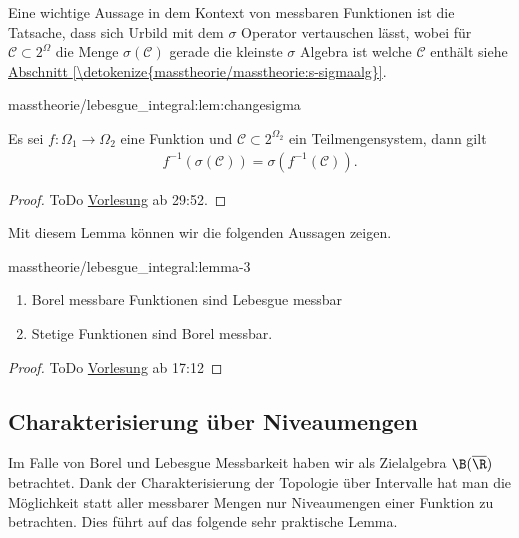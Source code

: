 \documentclass[letterpaper,10pt,german]{jupyterBook}
\begin{document}
\par
Eine wichtige Aussage in dem Kontext von messbaren Funktionen ist die Tatsache, dass sich Urbild mit dem \(\sigma\) Operator vertauschen lässt, wobei für \(\mathcal{C}\subset 2^\Omega\) die Menge \(\sigma(\mathcal{C})\) gerade die kleinste \(\sigma\) Algebra ist welche \(\mathcal{C}\) enthält siehe \hyperref[\detokenize{masstheorie/masstheorie:s-sigmaalg}]{Abschnitt \ref{\detokenize{masstheorie/masstheorie:s-sigmaalg}}}.
\begin{lemma}{}{masstheorie/lebesgue_integral:lem:changesigma}



\par
Es sei \(f:\Omega_1\to\Omega_2\) eine Funktion und \(\mathcal{C}\subset 2^{\Omega_2}\) ein Teilmengensystem, dann gilt
\begin{align*}
f^{-1}(\sigma(\mathcal{C})) = \sigma(f^{-1}(\mathcal{C})).
\end{align*}\end{lemma}

\begin{proof}
 ToDo
\href{https://www.fau.tv/clip/id/40563}{Vorlesung} ab 29:52.
\end{proof}

\par
Mit diesem Lemma können wir die folgenden Aussagen zeigen.
\begin{lemma}{}{masstheorie/lebesgue_integral:lemma-3}


\begin{enumerate}

\item {} 
\par
Borel messbare Funktionen sind Lebesgue messbar

\item {} 
\par
Stetige Funktionen sind Borel messbar.

\end{enumerate}
\end{lemma}

\begin{proof}
 ToDo
\href{https://www.fau.tv/clip/id/40563}{Vorlesung} ab 17:12
\end{proof}


\subsection{Charakterisierung über Niveaumengen}
\label{\detokenize{masstheorie/lebesgue_integral:charakterisierung-uber-niveaumengen}}
\par
Im Falle von Borel und Lebesgue Messbarkeit haben wir als Zielalgebra \(\B(\overline{\R})\) betrachtet. Dank der Charakterisierung der Topologie über Intervalle hat man die Möglichkeit statt aller messbarer Mengen nur Niveaumengen einer Funktion zu betrachten. Dies führt auf das folgende sehr praktische Lemma.
\end{document}
